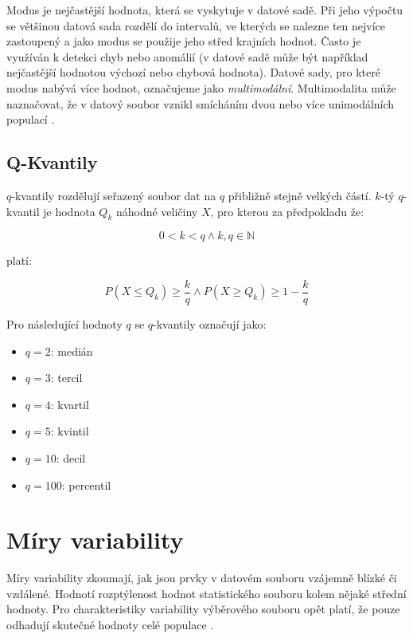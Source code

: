 Modus je nejčastější hodnota, která se vyskytuje v datové sadě. Při jeho výpočtu se většinou datová sada rozdělí do intervalů, ve kterých se nalezne ten nejvíce zastoupený a jako modus se použije jeho střed krajních hodnot. Často je využíván k detekci chyb nebo anomálií (v datové sadě může být například nejčastější hodnotou výchozí nebo chybová hodnota). Datové sady, pro které modus nabývá více hodnot, označujeme jako \emph{multimodální}. Multimodalita může naznačovat, že v datový soubor vznikl smícháním dvou nebo více unimodálních populací \cite{zahora}.

\subsection*{Q-Kvantily}

$q$-kvantily rozdělují seřazený soubor dat na $q$ přibližně stejně velkých částí. $k$-tý $q$-kvantil je hodnota $Q_k$ náhodné veličiny $X$, pro kterou za předpokladu že:

\begin{equation*}
    0 < k < q \wedge k, q \in \mathbb{N}
\end{equation*}

platí:

\begin{equation}
    P(X \leq  Q_k)\geq \frac{k}{q} \wedge P(X \geq Q_k) \geq 1 - \frac{k}{q}
\end{equation}

\medskip

Pro následující hodnoty $q$ se $q$-kvantily označují jako:
\begin{itemize}
    \item $q=2$: medián
    \item $q=3$: tercil
    \item $q=4$: kvartil
    \item $q=5$: kvintil
    \item $q=10$: decil
    \item $q=100$: percentil
\end{itemize}


\section{Míry variability}
\label{var_stats}

Míry variability zkoumají, jak jsou prvky v datovém souboru vzájemně blízké či vzdálené. Hodnotí rozptýlenost hodnot statistického souboru kolem nějaké střední hodnoty. Pro charakteristiky variability výběrového souboru opět platí, že pouze odhadují skutečné hodnoty celé populace \cite{variance}.


